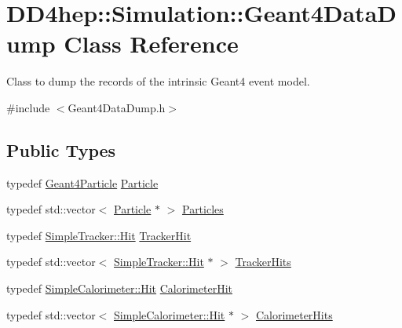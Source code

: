 \hypertarget{class_d_d4hep_1_1_simulation_1_1_geant4_data_dump}{
\section{DD4hep::Simulation::Geant4DataDump Class Reference}
\label{class_d_d4hep_1_1_simulation_1_1_geant4_data_dump}
}


Class to dump the records of the intrinsic Geant4 event model.  


{\ttfamily \#include $<$Geant4DataDump.h$>$}\subsection*{Public Types}
\begin{DoxyCompactItemize}
\item 
typedef \hyperlink{class_d_d4hep_1_1_simulation_1_1_geant4_particle}{Geant4Particle} \hyperlink{class_d_d4hep_1_1_simulation_1_1_geant4_data_dump_a94c26fac6b79beaaed2c75c680b3f374}{Particle}
\item 
typedef std::vector$<$ \hyperlink{class_d_d4hep_1_1_simulation_1_1_geant4_particle}{Particle} $\ast$ $>$ \hyperlink{class_d_d4hep_1_1_simulation_1_1_geant4_data_dump_a78b5910af0db1442a14600ae8dfc2a92}{Particles}
\item 
typedef \hyperlink{class_d_d4hep_1_1_simulation_1_1_geant4_tracker_1_1_hit}{SimpleTracker::Hit} \hyperlink{class_d_d4hep_1_1_simulation_1_1_geant4_data_dump_aaeea8b5b317a9a22e13f472200917ad2}{TrackerHit}
\item 
typedef std::vector$<$ \hyperlink{class_d_d4hep_1_1_simulation_1_1_geant4_tracker_1_1_hit}{SimpleTracker::Hit} $\ast$ $>$ \hyperlink{class_d_d4hep_1_1_simulation_1_1_geant4_data_dump_aa71f3341672792aa15c10e82cdbeca4b}{TrackerHits}
\item 
typedef \hyperlink{class_d_d4hep_1_1_simulation_1_1_geant4_calorimeter_1_1_hit}{SimpleCalorimeter::Hit} \hyperlink{class_d_d4hep_1_1_simulation_1_1_geant4_data_dump_abbb746f00c083cdb09c3e0331cb920be}{CalorimeterHit}
\item 
typedef std::vector$<$ \hyperlink{class_d_d4hep_1_1_simulation_1_1_geant4_calorimeter_1_1_hit}{SimpleCalorimeter::Hit} $\ast$ $>$ \hyperlink{class_d_d4hep_1_1_simulation_1_1_geant4_data_dump_a405c85a9a72c4f1dc0164d4a61d98f75}{CalorimeterHits}
\end{DoxyCompactItemize}
